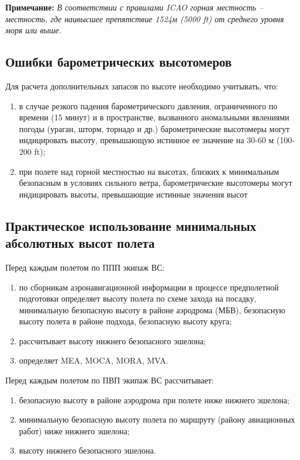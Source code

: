 \begin{appendix}
\textbf{Примечание:}
\textit{В соответствии с правилами ICAO горная местность – местность, где наивысшее препятствие 1524м (5000 ft) от среднего уровня моря или выше. }


    
\subsection{Ошибки барометрических высотомеров}

 Для расчета дополнительных запасов по высоте необходимо учитывать, что:
\begin{enumerate}[label=\alph*), ref=\alph*]
    \item в случае резкого падения барометрического давления, ограниченного по времени (15 минут) и в пространстве, вызванного аномальными явлениями погоды (ураган, шторм, торнадо и др.) барометрические высотомеры могут индицировать высоту, превышающую истинное ее значение на 30-60 м (100-200 ft);
    \item при полете над горной местностью на высотах, близких к минимальным безопасным в условиях сильного ветра, барометрические высотомеры могут индицировать высоты, превышающие истинные значения высот
\end{enumerate}
   

    
\subsection{Практическое использование минимальных абсолютных высот полета}

 Перед каждым полетом по ППП экипаж ВС:
\begin{enumerate}[label=\alph*), ref=\alph*]
    \item по сборникам аэронавигационной информации в процессе предполетной подготовки определяет высоту полета по схеме захода на посадку, минимальную безопасную высоту в районе аэродрома (МБВ), безопасную высоту полета в районе подхода, безопасную высоту круга;
    \item рассчитывает высоту нижнего безопасного эшелона;
    \item определяет MEA, MOCA, MORA, MVA.
\end{enumerate}


Перед каждым полетом по ПВП экипаж ВС рассчитывает:
\begin{enumerate}[label=\alph*), ref=\alph*]
    \item безопасную высоту в районе аэродрома при полете ниже нижнего эшелона;
    \item минимальную безопасную высоту полета по маршруту (району авиационных работ) ниже нижнего эшелона;
    \item высоту нижнего безопасного эшелона.    
\end{enumerate}



\end{appendix}
